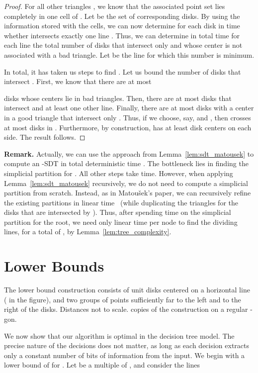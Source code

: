 \documentclass{paper}
\begin{document}
\begin{proof}
For all other triangles , we know that the associated point set
 lies completely in one cell of . Let  be the 
set of corresponding disks. By using the information stored with the cells, we 
can now determine for each disk  in
 time whether  intersects exactly one line .
Thus, we can determine in total time  for each line  the total
number of disks that intersect only  and whose center is not 
associated with
a bad triangle. Let  be the line for which this number is minimum.

In total, it has taken us  steps to find . Let us
bound the number of disks that intersect . First, we know that
there are at most 

disks whose centers lie in bad triangles. Then, there are at most
 disks that intersect  and at least one other line.
Finally, there are at most  disks with a center in a good 
triangle that intersect only . Thus, if we choose, say, 
  and , 
then  crosses at most  disks in . Furthermore, 
by construction,  has at least  disk centers on 
each side. The result follows.
\end{proof}

\noindent\textbf{Remark.} Actually, we can use the approach from 
Lemma~\ref{lem:sdt_matousek} to compute an -SDT in 
total deterministic time . The bottleneck 
lies in finding the simplicial partition for . All other steps take  time.
However, when applying Lemma~\ref{lem:sdt_matousek} recursively, we do not need
to compute a simplicial partition from scratch. Instead, as in Matou\v{s}ek's paper,
we can recursively refine the existing partitions in linear 
time~\cite[Corollary~3.5]{Matousek92} (while duplicating the triangles for the
disks that are intersected by ). Thus, after spending  time
on the simplicial partition for the root, we need only linear time per
node to find the dividing lines, for a total of , by 
Lemma~\ref{lem:tree_complexity}.


\section{Lower Bounds}

 {The lower bound construction 
consists of  unit disks centered on a horizontal line 
( in the figure), and two groups of  points sufficiently far 
to the left and to the right of the disks.
Distances not to scale.}
 { copies of the construction on a 
regular -gon. 
}

We now show that 
our algorithm is optimal in the decision tree model. 
The precise nature of the decisions does not matter, 
as long as each decision extracts only a constant number
of bits of information from the input.
We begin with a lower bound of  for .
Let  be a multiple of , and consider the lines 
\end{document}
